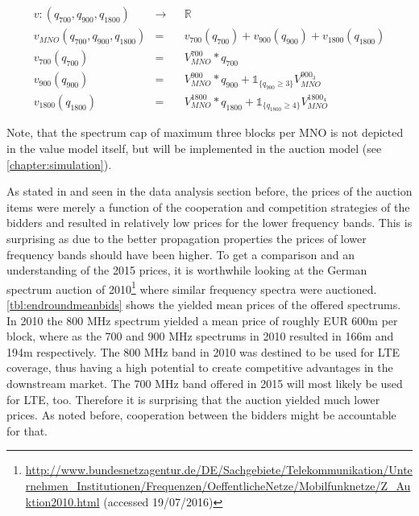 \begin{align}
v: (q_{700}, q_{900}, q_{1800}) &\longrightarrow&& \mathbb{R} \label{eq:vMNOabstract} \\
v_{MNO}(q_{700}, q_{900}, q_{1800}) &=&& v_{700}(q_{700}) + v_{900}(q_{900}) + v_{1800}(q_{1800}) \label{eq:vMNO} \\
v_{700}(q_{700}) &=&& V_{MNO}^{700} * q_{700} \label{eq:v700} \\
v_{900}(q_{900}) &=&& V_{MNO}^{900} * q_{900} + \mathbb{1}_{\{q_{900} \geq 3\}}V_{MNO}^{900_{3}} \label{eq:v900} \\
v_{1800}(q_{1800}) &=&& V_{MNO}^{1800} * q_{1800} + \mathbb{1}_{\{q_{1800} \geq 4\}}V_{MNO}^{1800_{4}} \label{eq:v1800}
\end{align}

Note, that the spectrum cap of maximum three blocks per MNO is not depicted in the value model itself, but will be implemented in the auction model (see \autoref{chapter:simulation}).

As stated in \cite{Bichler2016} and seen in the data analysis section before, the prices of the auction items were merely a function of the cooperation and competition strategies of the bidders and resulted in relatively low prices for the lower frequency bands. This is surprising as due to the better propagation properties the prices of lower frequency bands should have been higher. 
To get a comparison and an understanding of the 2015 prices, it is worthwhile looking  at the German spectrum auction of 2010\footnote{\url{http://www.bundesnetzagentur.de/DE/Sachgebiete/Telekommunikation/Unternehmen_Institutionen/Frequenzen/OeffentlicheNetze/Mobilfunknetze/Z_Auktion2010.html} (accessed 19/07/2016)}  where similar frequency spectra were auctioned. \autoref{tbl:endroundmeanbids} shows the yielded mean prices of the offered spectrums. In 2010 the 800 MHz spectrum yielded a mean price of roughly EUR 600m per block, where as the 700 and 900 MHz spectrums in 2010 resulted in 166m and 194m respectively. The 800 MHz band in 2010 was destined to be used for LTE coverage, thus having a high potential to create competitive advantages in the downstream market. The 700 MHz band offered in 2015 will most likely be used for LTE, too. Therefore it is surprising that the auction yielded much lower prices. As noted before, cooperation between the bidders might be accountable for that.

